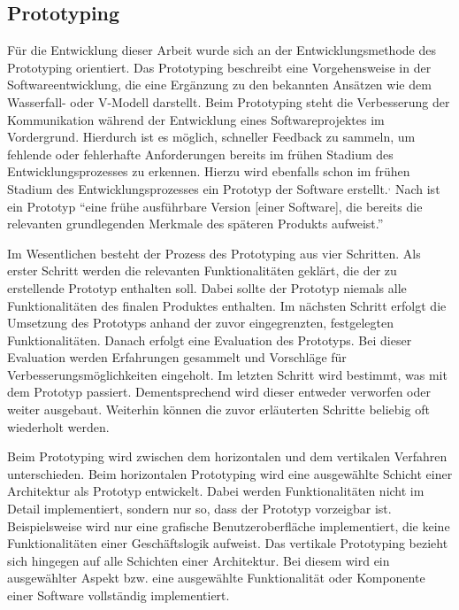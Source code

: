 \subsection{Prototyping}

Für die Entwicklung dieser Arbeit wurde sich an der Entwicklungsmethode des Prototyping orientiert.
Das Prototyping beschreibt eine Vorgehensweise in der Softwareentwicklung, die eine Ergänzung zu den bekannten Ansätzen wie dem Wasserfall- oder V-Modell darstellt.\autocite[Vgl.][S. 14]{MS-Floyd.1984} 
Beim Prototyping steht die Verbesserung der Kommunikation während der Entwicklung eines Softwareprojektes im Vordergrund.
Hierdurch ist es möglich, schneller Feedback zu sammeln, um fehlende oder fehlerhafte Anforderungen bereits im frühen Stadium des Entwicklungsprozesses zu erkennen.
Hierzu wird ebenfalls schon im frühen Stadium des Entwicklungsprozesses ein Prototyp der Software erstellt.\autocite[Vgl.][S. 3]{MS-Floyd.1984}$^,$\autocite[Vgl.][S. 368]{MS-Alpar.2019} 
Nach \citeauthor{MS-Alpar.2019} ist ein Prototyp \enquote{eine frühe ausführbare Version [einer Software], die bereits die relevanten grundlegenden Merkmale des späteren Produkts aufweist.}\autocite[Siehe][S. 369]{MS-Alpar.2019}

Im Wesentlichen besteht der Prozess des Prototyping aus vier Schritten. 
Als erster Schritt werden die relevanten Funktionalitäten geklärt, die der zu erstellende Prototyp enthalten soll.
Dabei sollte der Prototyp niemals alle Funktionalitäten des finalen Produktes enthalten.
Im nächsten Schritt erfolgt die Umsetzung des Prototyps anhand der zuvor eingegrenzten, festgelegten Funktionalitäten.
Danach erfolgt eine Evaluation des Prototyps.
Bei dieser Evaluation werden Erfahrungen gesammelt und Vorschläge für Verbesserungsmöglichkeiten eingeholt.
Im letzten Schritt wird bestimmt, was mit dem Prototyp passiert.
Dementsprechend wird dieser entweder verworfen oder weiter ausgebaut. 
Weiterhin können die zuvor erläuterten Schritte beliebig oft wiederholt werden.\autocite[Vgl.][S. 4 f.]{MS-Floyd.1984}

Beim Prototyping wird zwischen dem horizontalen und dem vertikalen Verfahren unterschieden. 
Beim horizontalen Prototyping wird eine ausgewählte Schicht einer Architektur als Prototyp entwickelt.
Dabei werden Funktionalitäten nicht im Detail implementiert, sondern nur so, dass der Prototyp vorzeigbar ist.
Beispielsweise wird nur eine grafische Benutzeroberfläche implementiert, die keine Funktionalitäten einer Geschäftslogik aufweist.
Das vertikale Prototyping bezieht sich hingegen auf alle Schichten einer Architektur. 
Bei diesem wird ein ausgewählter Aspekt bzw. eine ausgewählte Funktionalität oder Komponente einer Software vollständig implementiert.\autocite[Vgl.][Abschnitt \enquote{Arten von Prototypen}]{MS-Kuhrmann.26.09.2012}\autocite[Vgl.][S. 4]{MS-Floyd.1984} 

